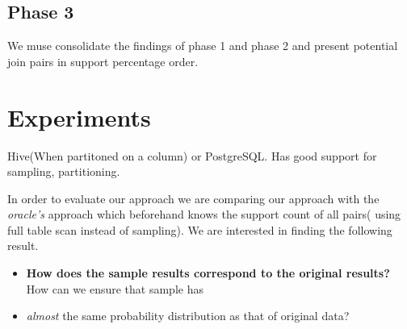 \documentclass{article}
\begin{document}
\subsection{Phase 3}
We muse consolidate the findings of phase 1 and phase 2 and present potential join pairs in support percentage order.
\section{Experiments}

Hive(When partitoned on a column) or PostgreSQL. Has good support for sampling, partitioning. 

In order to evaluate our approach we are comparing our approach with the \textit{oracle's} approach which beforehand knows the support count of all pairs( using full table scan instead of sampling). We are interested in finding the following result.

\begin{itemize}

\item \textbf{How does the sample results correspond to the original results? } How can we ensure that sample has \item \textit{almost} the same probability distribution as that of original data? 

\end{itemize}
\end{document}
